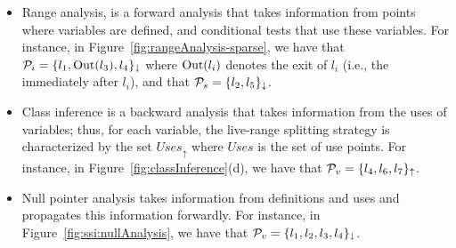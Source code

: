 \begin{itemize}
\item Range analysis, is a forward analysis that takes information from points where variables are defined, and conditional tests that use these variables.
For instance, in Figure~\ref{fig:rangeAnalysis-sparse}, we have that ${\cal P}_{i} = \{l_1, \textrm{Out}(l_3), l_4\}_\downarrow$ where $\textrm{Out}(l_i)$ denotes the exit of $l_i$ (i.e., the \progpoint immediately after $l_i$), and that ${\cal P}_{s}=\{l_2, l_5\}_\downarrow$.

\item Class inference is a backward analysis that takes information from the uses of variables; thus, for each variable, the live-range splitting strategy is characterized by the set $\textit{Uses}_\uparrow$ where $\textit{Uses}$ is the set of use points.
For instance, in Figure~\ref{fig:classInference}(d), we have that
${\cal P}_{v} = \{l_4, l_6,l_7\}_\uparrow$.


\item Null pointer analysis takes information from definitions and uses and propagates this information forwardly.
For instance, in Figure~\ref{fig:ssi:nullAnalysis}, we have that
${\cal P}_{v} = \{l_1, l_2, l_3, l_4\}_\downarrow$.
\end{itemize}

